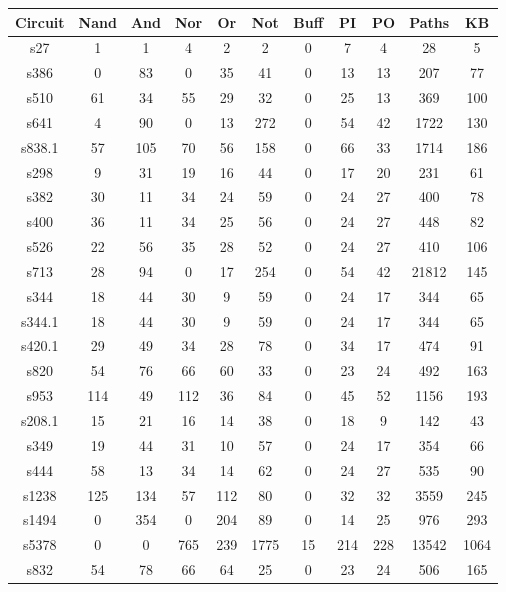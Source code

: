 \documentclass[a4paper,12pt]{article}
\begin{document}
\begin{center}
\begin{tabular}{||c c c c c c c c c c c||}
\hline
Circuit & Nand & And & Nor & Or& Not & Buff & PI & PO & Paths & KB \\ [0.5ex] 
\hline\hline
s27 & 1 & 1 & 4 & 2 & 2 & 0 & 7 & 4 & 28 & 5 \\ 
\hline
s386 & 0 & 83 & 0 & 35 & 41 & 0 & 13 & 13 & 207 & 77 \\ 
\hline
s510 & 61 & 34 & 55 & 29 & 32 & 0 & 25 & 13 & 369 & 100 \\ 
\hline
s641 & 4 & 90 & 0 & 13 & 272 & 0 & 54 & 42 & 1722 & 130 \\ 
\hline
s838.1 & 57 & 105 & 70 & 56 & 158 & 0 & 66 & 33 & 1714 & 186 \\ 
\hline
s298 & 9 & 31 & 19 & 16 & 44 & 0 & 17 & 20 & 231 & 61 \\ 
\hline
s382 & 30 & 11 & 34 & 24 & 59 & 0 & 24 & 27 & 400 & 78 \\ 
\hline
s400 & 36 & 11 & 34 & 25 & 56 & 0 & 24 & 27 & 448 & 82 \\ 
\hline
s526 & 22 & 56 & 35 & 28 & 52 & 0 & 24 & 27 & 410 & 106 \\ 
\hline
s713 & 28 & 94 & 0 & 17 & 254 & 0 & 54 & 42 & 21812 & 145 \\ 
\hline
s344 & 18 & 44 & 30 & 9 & 59 & 0 & 24 & 17 & 344 & 65 \\ 
\hline
s344.1 & 18 & 44 & 30 & 9 & 59 & 0 & 24 & 17 & 344 & 65 \\ 
\hline
s420.1 & 29 & 49 & 34 & 28 & 78 & 0 & 34 & 17 & 474 & 91 \\ 
\hline
s820 & 54 & 76 & 66 & 60 & 33 & 0 & 23 & 24 & 492 & 163 \\ 
\hline
s953 & 114 & 49 & 112 & 36 & 84 & 0 & 45 & 52 & 1156 & 193 \\ 
\hline
s208.1 & 15 & 21 & 16 & 14 & 38 & 0 & 18 & 9 & 142 & 43 \\ 
\hline
s349 & 19 & 44 & 31 & 10 & 57 & 0 & 24 & 17 & 354 & 66 \\ 
\hline
s444 & 58 & 13 & 34 & 14 & 62 & 0 & 24 & 27 & 535 & 90 \\ 
\hline
s1238 & 125 & 134 & 57 & 112 & 80 & 0 & 32 & 32 & 3559 & 245 \\ 
\hline
s1494 & 0 & 354 & 0 & 204 & 89 & 0 & 14 & 25 & 976 & 293 \\ 
\hline
s5378 & 0 & 0 & 765 & 239 & 1775 & 15 & 214 & 228 & 13542 & 1064 \\ 
\hline
s832 & 54 & 78 & 66 & 64 & 25 & 0 & 23 & 24 & 506 & 165 \\ 

\end{tabular}
\end{center}
\end{document}
